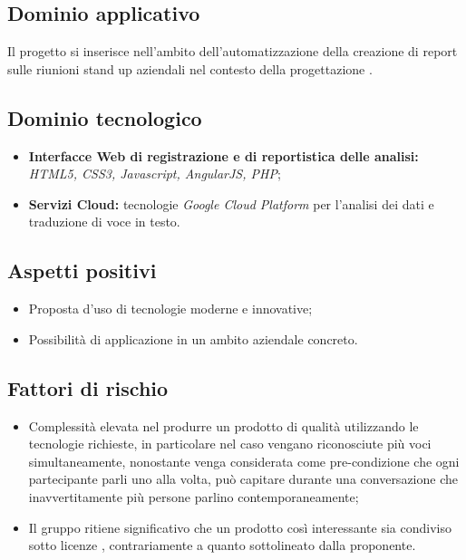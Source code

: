 \documentclass[openany,12pt,a4paper]{report}
\begin{document}
	\subsection{Dominio applicativo}
	
	Il progetto si inserisce nell'ambito dell'automatizzazione della creazione di report sulle riunioni stand up aziendali nel contesto della progettazione .
	
	\subsection{Dominio tecnologico}
	
	\begin{itemize}
		\item \textbf{Interfacce Web di registrazione e di reportistica delle analisi:} \textit{HTML5, CSS3, Javascript, AngularJS, PHP};
		
		\item \textbf{Servizi Cloud:} tecnologie \textit{Google Cloud Platform} per l’analisi dei dati e traduzione di voce in testo.
	\end{itemize}
	
	\subsection{Aspetti positivi}
	
	\begin{itemize}
		\item Proposta d'uso di tecnologie moderne e innovative;
		
		\item Possibilità di applicazione in un ambito aziendale concreto.
	\end{itemize}
	
	\subsection{Fattori di rischio}
	
	\begin{itemize}
		\item Complessità elevata nel produrre un prodotto di qualità utilizzando le tecnologie richieste, in particolare nel caso vengano riconosciute più voci simultaneamente, nonostante venga considerata come pre-condizione che ogni partecipante parli uno alla volta, può capitare durante una conversazione che inavvertitamente più persone parlino contemporaneamente;
		
		\item Il gruppo ritiene significativo che un prodotto così interessante sia condiviso sotto licenze , contrariamente a quanto sottolineato dalla proponente.
	\end{itemize}
	
\end{document}
